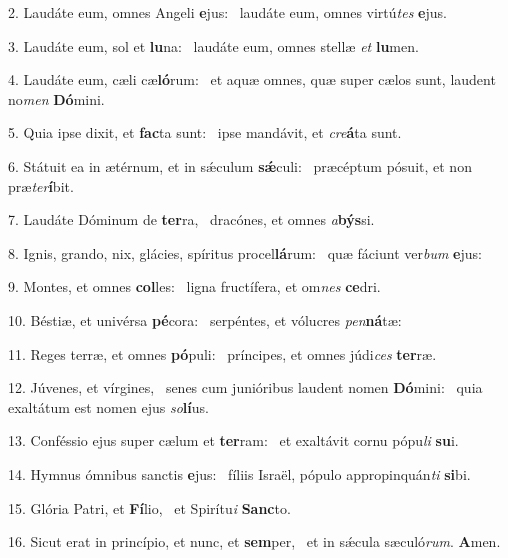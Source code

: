 2. Laudáte eum, omnes Angeli \textbf{e}jus: \ast\  laudáte eum, omnes virtú\textit{tes} \textbf{e}jus.\

3. Laudáte eum, sol et \textbf{lu}na: \ast\  laudáte eum, omnes stellæ \textit{et} \textbf{lu}men.\

4. Laudáte eum, cæli cæ\textbf{ló}rum: \ast\  et aquæ omnes, quæ super cælos sunt, laudent no\textit{men} \textbf{Dó}mini.\

5. Quia ipse dixit, et \textbf{fac}ta sunt: \ast\  ipse mandávit, et \textit{cre}\textbf{á}ta sunt.\

6. Státuit ea in ætérnum, et in sǽculum \textbf{sǽ}culi: \ast\  præcéptum pósuit, et non præ\textit{ter}\textbf{í}bit.\

7. Laudáte Dóminum de \textbf{ter}ra, \ast\  dracónes, et omnes \textit{a}\textbf{býs}si.\

8. Ignis, grando, nix, glácies, spíritus procel\textbf{lá}rum: \ast\  quæ fáciunt ver\textit{bum} \textbf{e}jus:\

9. Montes, et omnes \textbf{col}les: \ast\  ligna fructífera, et om\textit{nes} \textbf{ce}dri.\

10. Béstiæ, et univérsa \textbf{pé}cora: \ast\  serpéntes, et vólucres \textit{pen}\textbf{ná}tæ:\

11. Reges terræ, et omnes \textbf{pó}puli: \ast\  príncipes, et omnes júdi\textit{ces} \textbf{ter}ræ.\

12. Júvenes, et vírgines, \dag\  senes cum junióribus laudent nomen \textbf{Dó}mini: \ast\  quia exaltátum est nomen ejus \textit{so}\textbf{lí}us.\

13. Conféssio ejus super cælum et \textbf{ter}ram: \ast\  et exaltávit cornu pópu\textit{li} \textbf{su}i.\

14. Hymnus ómnibus sanctis \textbf{e}jus: \ast\  fíliis Israël, pópulo appropinquán\textit{ti} \textbf{si}bi.\

15. Glória Patri, et \textbf{Fí}lio, \ast\  et Spirítu\textit{i} \textbf{Sanc}to.\

16. Sicut erat in princípio, et nunc, et \textbf{sem}per, \ast\  et in sǽcula sæculó\textit{rum}. \textbf{A}men.\

